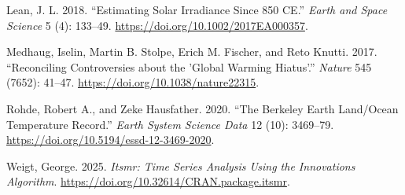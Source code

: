 \documentclass[
  letterpaper,
  DIV=11,
  numbers=noendperiod]{scrartcl}
\newlength{\cslhangindent}
\newenvironment{CSLReferences}[2] %
 {\begin{list}{}{%
  \setlength{\itemindent}{0pt}
  \setlength{\leftmargin}{0pt}
  \setlength{\parsep}{0pt}
  \ifodd #1
   \setlength{\leftmargin}{\cslhangindent}
   \setlength{\itemindent}{-1\cslhangindent}
  \fi
  \setlength{\itemsep}{#2\baselineskip}}}
 {\end{list}}
\begin{document}
\begin{CSLReferences}{1}{0}
Lean, J. L. 2018. {``Estimating Solar Irradiance Since 850 {CE}.''}
\emph{Earth and Space Science} 5 (4): 133--49.
\url{https://doi.org/10.1002/2017EA000357}.

Medhaug, Iselin, Martin B. Stolpe, Erich M. Fischer, and Reto Knutti.
2017. {``Reconciling Controversies about the 'Global Warming Hiatus'.''}
\emph{Nature} 545 (7652): 41--47.
\url{https://doi.org/10.1038/nature22315}.

Rohde, Robert A., and Zeke Hausfather. 2020. {``The Berkeley Earth
Land/Ocean Temperature Record.''} \emph{Earth System Science Data} 12
(10): 3469--79. \url{https://doi.org/10.5194/essd-12-3469-2020}.

Weigt, George. 2025. \emph{Itsmr: Time Series Analysis Using the
Innovations Algorithm}.
\url{https://doi.org/10.32614/CRAN.package.itsmr}.

\end{CSLReferences}
\end{document}
